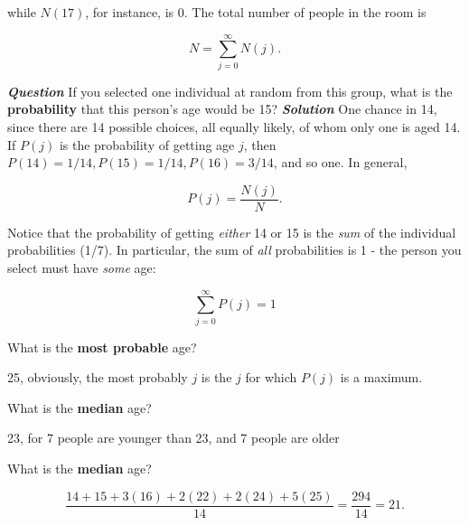 \documentclass[svgnames]{article}   	%
\begin{document}
while $N(17)$, for instance, is 0. The total number of people in the room is 

\vspace{5px}\[
  N = \sum_{j=0}^{\infty} N(j). 
\] \vspace{5px}


\textbf{\textit{Question}} \vspace{10px} 
If you selected one individual at random from this group, what is the
\textbf{probability} that this person's age would be 15? \vspace{10px}
\textbf{\textit{Solution}} \vspace{10px}
One chance in 14, since there are 14 possible choices, all equally likely, of
whom only one is aged 14. If $P(j)$ is the probability of getting age $j$,
then $P(14) = 1/14, P(15) = 1/14, P(16) = 3/14$, and so one. In general, 

\vspace{5px}\[
P(j) = \frac{N(j)}{N}.
\] \vspace{5px} 

Notice that the probability of getting \textit{either} 14 or 15 is the
\textit{sum} of the individual probabilities (1/7). In particular, the sum of
\textit{all} probabilities is 1 - the person you select must have \textit{some}
age: 

\vspace{5px} \[
\sum_{j=0}^{\infty} P(j) =1
\] \vspace{5px}

\begin{tcolorbox}[colback = blue!5!white, colframe = blue!50!black, title
= Question]
What is the \textbf{most probable} age? 
\end{tcolorbox} 

\begin{tcolorbox}[colback = red!5!white, colframe = red!50!black, title
= Solution]
25, obviously, the most probably $j$ is the $j$ for which $P(j)$ is a maximum. 
\end{tcolorbox} 

\begin{tcolorbox}[colback = blue!5!white, colframe = blue!50!black, title
= Question]
What is the \textbf{median} age?   
\end{tcolorbox} 

\begin{tcolorbox}[colback = red!5!white, colframe = red!50!black, title
= Solution]
23, for 7 people are younger than 23, and 7 people are older  
\end{tcolorbox} 

\begin{tcolorbox}[colback = blue!5!white, colframe = blue!50!black, title
= Question]
What is the \textbf{median} age?
\end{tcolorbox} 

\begin{tcolorbox}[colback = red!5!white, colframe = red!50!black, title
= Solution]
\[
\frac{14 + 15 + 3(16) + 2(22) + 2(24) + 5(25)}{14} = \frac{294}{14} = 21.
\]

\end{tcolorbox} 
\end{document}
